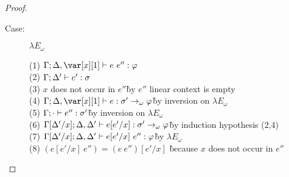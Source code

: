 \begin{proof}
\begin{description}
\item[Case:] $\lambda E_\omega$
\begin{tabbing}
  (1) $\G; \D, \xl \vdash e~e'' : \vp$\\
  (2) $\Gamma; \Delta' \vdash e' : \sigma$\\
  (3) $x$ does not occur in $e''$\` by $e''$ linear context is empty\\
  (4) $\G; \D, \xl \vdash e : \s' \to_\omega \vp$\` by inversion on $\lambda E_\omega$\\
  (5) $\Gamma; \cdot \vdash e'' : \sigma'$\` by inversion on $\lambda E_\omega$\\
  (6) $\Gamma[\Delta'/x]; \Delta, \Delta' \vdash e[e'/x] : \sigma' \to_\omega \varphi$\` by induction hypothesis (2,4)\\
  (7) $\Gamma[\Delta'/x]; \Delta, \Delta' \vdash e[e'/x]~e'' : \varphi$\` by $\lambda E_\omega$\\
  (8) $(e[e'/x]~e'') = (e~e'')[e'/x]$ \` because $x$ does not occur in $e''$\\
\end{tabbing}


\end{description}
\end{proof}
